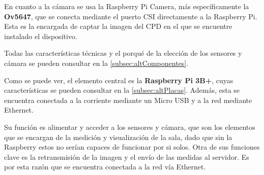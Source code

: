 En cuanto a la cámara se usa la Raspberry Pi Camera, más específicamente la \textbf{Ov5647}, que se conecta mediante el puerto CSI directamente a la Raspberry Pi. Esta es la encargada de captar la imagen del CPD en el que se encuentre instalado el dispositivo.

Todas las características técnicas y el porqué de la elección de los sensores y cámara se pueden consultar en la \autoref{subsec:altComponentes}.

Como se puede ver, el elemento central es la \textbf{Raspberry Pi 3B+}, cuyas características se pueden consultar en la \autoref{subsec:altPlacas}. Además, esta se encuentra conectada a la corriente mediante un Micro USB y a la red mediante Ethernet.

Su función es alimentar y acceder a los sensores y cámara, que son los elementos que se encargan de la medición y visualización de la sala, dado que sin la Raspberry estos no serían capaces de funcionar por si solos. Otra de sus funciones clave es la retransmisión de la imagen y el envío de las medidas al servidor. Es por esta razón que se encuentra conectada a la red vía Ethernet.
